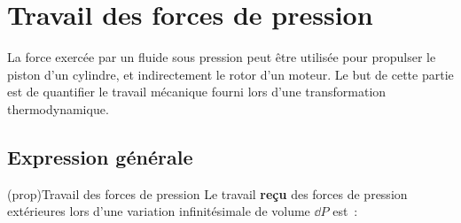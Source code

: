 \documentclass[../../main/main.tex]{subfiles}
\begin{document}
\section{Travail des forces de pression}
La force exercée par un fluide sous pression peut être utilisée pour propulser
le piston d'un cylindre, et indirectement le rotor d'un moteur. Le but de cette
partie est de quantifier le travail mécanique fourni lors d'une transformation
thermodynamique.

\subsection{Expression générale}

\begin{tcb*}(prop){Travail des forces de pression}
	Le travail \textbf{reçu} des forces de pression extérieures lors d'une
	variation infinitésimale de volume $\dd{P}$ est~:
	\psw{%
		\[
			\boxed{\delta W_p = -P\ind{ext}\dd{V}}
			\quad \Ra \quad
			W_p = - \int_{V_i}^{V_f}P\ind{ext}\dd{V}
		\]
	}%
\end{tcb*}
\end{document}
